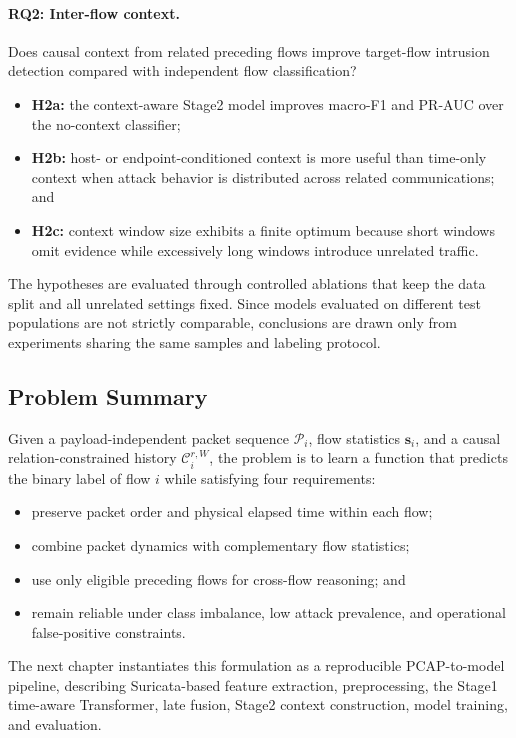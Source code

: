 \paragraph{RQ2: Inter-flow context.}
Does causal context from related preceding flows improve target-flow intrusion
detection compared with independent flow classification?

\begin{itemize}
    \item \textbf{H2a:} the context-aware Stage2 model improves macro-F1 and
    PR-AUC over the no-context classifier;
    \item \textbf{H2b:} host- or endpoint-conditioned context is more useful
    than time-only context when attack behavior is distributed across related
    communications; and
    \item \textbf{H2c:} context window size exhibits a finite optimum because
    short windows omit evidence while excessively long windows introduce
    unrelated traffic.
\end{itemize}

The hypotheses are evaluated through controlled ablations that keep the data
split and all unrelated settings fixed. Since models evaluated on different
test populations are not strictly comparable, conclusions are drawn only from
experiments sharing the same samples and labeling protocol.

\subsection{Problem Summary}
\label{subsec:pf_summary}

Given a payload-independent packet sequence $\mathcal{P}_i$, flow statistics
$\mathbf{s}_i$, and a causal relation-constrained history
$\mathcal{C}_{i}^{r,W}$, the problem is to learn a function that predicts the
binary label of flow $i$ while satisfying four requirements:

\begin{itemize}
    \item preserve packet order and physical elapsed time within each flow;
    \item combine packet dynamics with complementary flow statistics;
    \item use only eligible preceding flows for cross-flow reasoning; and
    \item remain reliable under class imbalance, low attack prevalence, and
    operational false-positive constraints.
\end{itemize}

The next chapter instantiates this formulation as a reproducible PCAP-to-model
pipeline, describing Suricata-based feature extraction, preprocessing, the
Stage1 time-aware Transformer, late fusion, Stage2 context construction, model
training, and evaluation.
